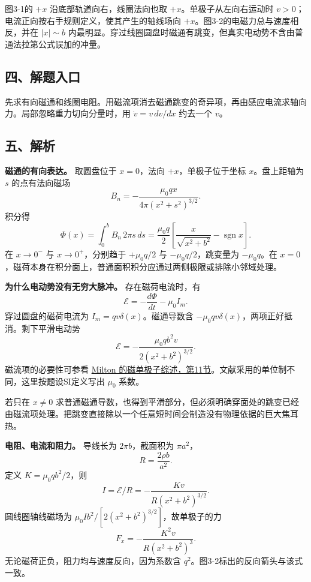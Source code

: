 \documentclass[12pt,a4paper,UTF8]{ctexart}
\begin{document}
图3-1的 \(+x\) 沿底部轨道向右，线圈法向也取 \(+x\)。单极子从左向右运动时
\(v>0\)；电流正向按右手规则定义，使其产生的轴线场向
\(+x\)。图3-2的电磁力总与速度相反，并在 \(|x|\sim b\)
内最明显。穿过线圈圆盘时磁通有跳变，但真实电动势不含由普通法拉第公式误加的冲量。

\subsection{四、解题入口}\label{ux56dbux89e3ux9898ux5165ux53e3-2}

先求有向磁通和线圈电阻。用磁流项消去磁通跳变的奇异项，再由感应电流求轴向力。局部忽略重力切向分量时，用
\(\dot v=v\,dv/dx\) 约去一个 \(v\)。

\subsection{五、解析}\label{ux4e94ux89e3ux6790-2}

\textbf{磁通的有向表达。} 取圆盘位于 \(x=0\)，法向
\(+x\)，单极子位于坐标 \(x\)。盘上距轴为 \(s\) 的点有法向磁场 \[
B_n=-\frac{\mu_0qx}{4\pi(x^2+s^2)^{3/2}}.
\] 积分得 \[
\Phi(x)=\int_0^bB_n\,2\pi s\,ds
=\boxed{\frac{\mu_0q}{2}
\left[\frac{x}{\sqrt{x^2+b^2}}-\operatorname{sgn}x\right]}.
\] 在 \(x\to0^-\) 与 \(x\to0^+\)，分别趋于 \(+\mu_0q/2\) 与
\(-\mu_0q/2\)，跳变量为 \(-\mu_0q\)。在
\(x=0\)，磁荷本身在积分面上，普通面积积分应通过两侧极限或排除小邻域处理。

\textbf{为什么电动势没有无穷大脉冲。} 存在磁荷电流时，有 \[
\mathcal E=-\frac{d\Phi}{dt}-\mu_0I_m.
\] 穿过圆盘的磁荷电流为 \(I_m=qv\delta(x)\)。磁通导数含
\(-\mu_0qv\delta(x)\)，两项正好抵消。剩下平滑电动势 \[
\boxed{\mathcal E=
-\frac{\mu_0qb^2v}{2(x^2+b^2)^{3/2}}}.
\] 磁流项的必要性可参看
\href{https://www.nevis.columbia.edu/~phypharm/monopole/monopoleReview2006.pdf}{Milton
的磁单极子综述，第11节}。文献采用的单位制不同，这里按题设SI定义写出
\(\mu_0\) 系数。

若只在 \(x\ne0\)
求普通磁通导数，也得到平滑部分，但必须明确穿面处的跳变已经由磁流项处理。把跳变直接除以一个任意短时间会制造没有物理依据的巨大焦耳热。

\textbf{电阻、电流和阻力。} 导线长为 \(2\pi b\)，截面积为 \(\pi a^2\)，
\[
R=\frac{2\rho b}{a^2}.
\] 定义 \(K=\mu_0qb^2/2\)，则 \[
I=\mathcal E/R=-\frac{Kv}{R(x^2+b^2)^{3/2}}.
\] 圆线圈轴线磁场为 \(\mu_0Ib^2/[2(x^2+b^2)^{3/2}]\)，故单极子的力 \[
\boxed{F_x=-\frac{K^2v}{R(x^2+b^2)^3}}.
\] 无论磁荷正负，阻力均与速度反向，因为系数含
\(q^2\)。图3-2标出的反向箭头与该式一致。
\end{document}
